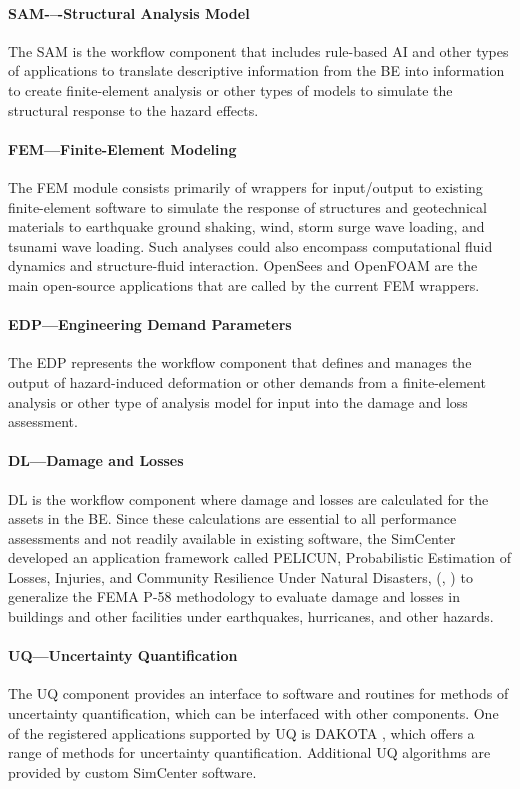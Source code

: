 \paragraph{SAM-–-Structural Analysis Model} The SAM is the workflow component that includes rule-based AI and other types of applications to translate descriptive information from the BE into information to create finite-element analysis or other types of models to simulate the structural response to the hazard effects. 

\paragraph{FEM---Finite-Element Modeling} The FEM module consists primarily of wrappers for input/output to  existing finite-element software to simulate the response of structures and geotechnical materials to earthquake ground shaking, wind, storm surge wave loading, and tsunami wave loading.  Such analyses could also encompass computational fluid dynamics and structure-fluid interaction.  OpenSees  and OpenFOAM  are the main open-source applications that are called by the current FEM wrappers.

\paragraph{EDP---Engineering Demand Parameters} The EDP represents the workflow component that defines and manages the output of hazard-induced deformation or other demands from a finite-element analysis or other type of analysis model for input into the damage and loss assessment.

\paragraph{DL---Damage and Losses}  DL is the workflow component where damage and losses are calculated for the assets in the BE. Since these calculations are essential to all performance assessments and not readily available in existing software, the SimCenter developed an application framework called PELICUN, Probabilistic Estimation of Losses, Injuries, and Community Resilience Under Natural Disasters, (\cite{zsarnoczay2020pelicun}, ) to generalize the FEMA P-58 methodology to evaluate damage and losses in buildings and other facilities under earthquakes, hurricanes, and other hazards. 

\paragraph{UQ---Uncertainty Quantification} The UQ component provides an interface to software and routines for methods of uncertainty quantification, which can be interfaced with other components.  One of the registered applications supported by UQ is DAKOTA \citep{adams2009dakota}, which offers a range of methods for uncertainty quantification. Additional UQ algorithms are provided by custom SimCenter software.

